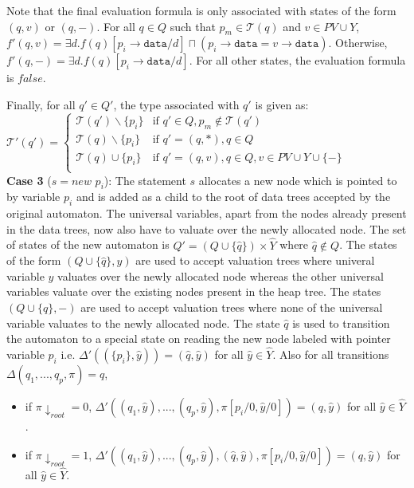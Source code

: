 \documentclass{llncs}
\newcommand{\data}{\texttt{data}}
\begin{document}
Note that the final evaluation formula is only associated with states of the form $(q, v)$ or $ (q,-)$. For all $q \in Q$ such that $p_m \in \mathcal{T}(q)$ and $v \in PV \cup Y$, $f'(q,v) = \exists d. f(q)[p_i\rightarrow\data/d] \sqcap (p_i\rightarrow\data = v\rightarrow\data)$. Otherwise, $f'(q,-) = \exists d. f(q)[p_i\rightarrow\data/d]$.
For all other states, the evaluation formula is $false$.


Finally, for all $q' \in Q'$, the type associated with $q'$ is given as:\\
$\mathcal{T'}(q') = \begin{cases}
        \mathcal{T}(q') \backslash \{p_i\} & \text{if $q' \in Q, p_m \notin \mathcal{T}(q')$ }\\
	  \mathcal{T}(q) \backslash \{p_i\} & \text{if $q' = (q,*), q \in Q$ }\\
	  \mathcal{T}(q) \cup \{p_i\}& \text{if $q' = (q, v), q \in Q, v \in PV \cup Y \cup \{-\}$}\\
							
      \end{cases}
$\\
\newline\newline
{\bf Case 3} ($s = new$ $p_i$): The statement $s$ allocates a new node which is pointed to by variable $p_i$ and is added as a child to the root of data trees accepted by the original automaton. The universal variables, apart from the nodes already present in the data trees, now also have to valuate over the newly allocated node. The set of states of the new automaton is $Q' = (Q \cup \{\hat{q}\}) \times \hat{Y}$ where $\hat{q} \notin Q$. The states of the form $(Q \cup \{\hat{q}\}, y)$ are used to accept valuation trees where univeral variable $y$ valuates over the newly allocated node whereas the other universal variables valuate over the existing nodes present in the heap tree. The states $(Q \cup \{\hat{q}\}, -)$ are used to accept valuation trees where none of the universal variable valuates to the newly allocated node. The state $\hat{q}$ is used to transition the automaton to a special state on reading the new node labeled with pointer variable $p_i$ i.e. $\Delta'((\{p_i\}, \hat{y})) = (\hat{q}, \hat{y})$ for all $\hat{y} \in \hat{Y}$. Also for all transitions $\Delta(q_1, ..., q_p, \pi) = q$,
\begin{itemize}
\item if $\pi \downarrow_{{root}} = 0$, $\Delta'((q_1, \hat{y}), ..., (q_p, \hat{y}), \pi[p_i/0, \hat{y}/0]) = (q, \hat{y})$ for all $\hat{y} \in \hat{Y}$. 
\item if $\pi \downarrow_{{root}} = 1$, $\Delta'((q_1, \hat{y}), ..., (q_p, \hat{y}), (\hat{q}, \hat{y}), \pi[p_i/0, \hat{y}/0]) =  (q, \hat{y})$ for all $\hat{y} \in \hat{Y}$.
\end{itemize}
\end{document}
